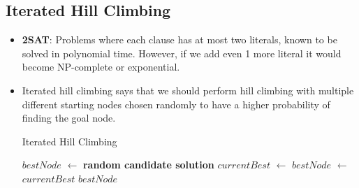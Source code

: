 \documentclass[a4paper]{article}
\begin{document}
\subsection{Iterated Hill Climbing}
\begin{itemize}
    \item \textbf{2SAT}: Problems where each clause has at most two literals, known to be solved in polynomial time. However, if we add even 1 more literal it would become NP-complete or exponential.
    \item Iterated hill climbing says that we should perform hill climbing with multiple different starting nodes chosen randomly to have a higher probability of finding the goal node.
    \begin{algorithm}[H]
        \caption{Iterated Hill Climbing}\label{alg:AI-iterated-hill-climbing}
        \begin{algorithmic}[1]
            \Statex {}
            \State $bestNode$ $\gets$ \textbf{random candidate solution}
                \State $currentBest$ $\gets$ 
                    \State $bestNode$ $\gets$ $currentBest$
                \EndIf
            \EndFor
            \State \Return $bestNode$
        \end{algorithmic}
    \end{algorithm}
\end{itemize}
\end{document}
